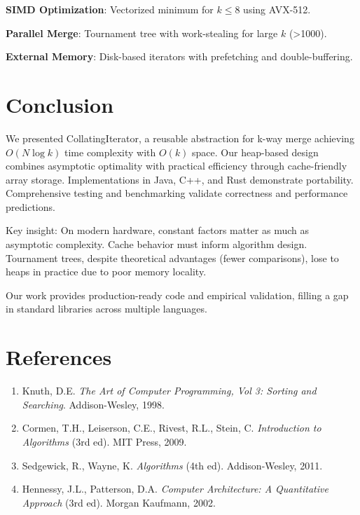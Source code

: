 \documentclass[11pt]{article}
\begin{document}
\textbf{SIMD Optimization}: Vectorized minimum for $k \leq 8$ using AVX-512.

\textbf{Parallel Merge}: Tournament tree with work-stealing for large $k$ (>1000).

\textbf{External Memory}: Disk-based iterators with prefetching and double-buffering.

\section{Conclusion}

We presented CollatingIterator, a reusable abstraction for k-way merge achieving $O(N \log k)$ time complexity with $O(k)$ space. Our heap-based design combines asymptotic optimality with practical efficiency through cache-friendly array storage. Implementations in Java, C++, and Rust demonstrate portability. Comprehensive testing and benchmarking validate correctness and performance predictions.

Key insight: On modern hardware, constant factors matter as much as asymptotic complexity. Cache behavior must inform algorithm design. Tournament trees, despite theoretical advantages (fewer comparisons), lose to heaps in practice due to poor memory locality.

Our work provides production-ready code and empirical validation, filling a gap in standard libraries across multiple languages.

\section*{References}

\begin{enumerate}
    \item Knuth, D.E. \textit{The Art of Computer Programming, Vol 3: Sorting and Searching}. Addison-Wesley, 1998.
    \item Cormen, T.H., Leiserson, C.E., Rivest, R.L., Stein, C. \textit{Introduction to Algorithms} (3rd ed). MIT Press, 2009.
    \item Sedgewick, R., Wayne, K. \textit{Algorithms} (4th ed). Addison-Wesley, 2011.
    \item Hennessy, J.L., Patterson, D.A. \textit{Computer Architecture: A Quantitative Approach} (3rd ed). Morgan Kaufmann, 2002.
\end{enumerate}
\end{document}
